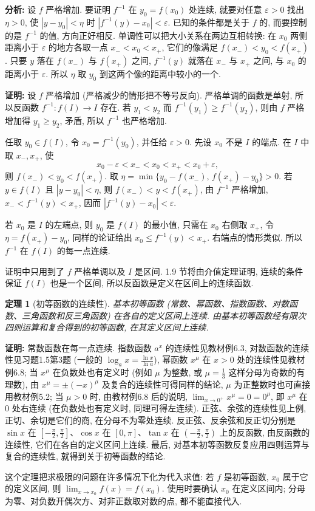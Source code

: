 \documentclass[UTF8,openany]{ctexbook}
\theoremstyle{chinesetextbook}
\newtheorem{theorem}{定理}[section]
\newenvironment{cnproof}{\par\indent\textbf{证明:} \ignorespaces}{\par}
\begin{document}
\par\indent\textbf{分析:} 设 $f$ 严格增加. 要证明 $f^{-1}$ 在 $y_0=f(x_0)$ 处连续, 就要对任意 $\varepsilon>0$ 找出 $\eta>0$, 使 $|y-y_0|<\eta$ 时 $|f^{-1}(y)-x_0|<\varepsilon$. 已知的条件都是关于 $f$ 的, 而要控制的是 $f^{-1}$ 的值, 方向正好相反. 单调性可以把大小关系在两边互相转换: 在 $x_0$ 两侧距离小于 $\varepsilon$ 的地方各取一点 $x_-<x_0<x_+$, 它们的像满足 $f(x_-)<y_0<f(x_+)$. 只要 $y$ 落在 $f(x_-)$ 与 $f(x_+)$ 之间, $f^{-1}(y)$ 就落在 $x_-$ 与 $x_+$ 之间, 与 $x_0$ 的距离小于 $\varepsilon$. 所以 $\eta$ 取 $y_0$ 到这两个像的距离中较小的一个.
\begin{cnproof}
设 $f$ 严格增加 (严格减少的情形把不等号反向). 严格单调的函数是单射, 所以反函数 $f^{-1}:f(I)\to I$ 存在. 若 $y_1<y_2$ 而 $f^{-1}(y_1)\ge f^{-1}(y_2)$, 则由 $f$ 严格增加得 $y_1\ge y_2$, 矛盾, 所以 $f^{-1}$ 也严格增加.

任取 $y_0\in f(I)$, 令 $x_0=f^{-1}(y_0)$, 并任给 $\varepsilon>0$. 先设 $x_0$ 不是 $I$ 的端点. 在 $I$ 中取 $x_-,x_+$, 使
\[
x_0-\varepsilon<x_-<x_0<x_+<x_0+\varepsilon,
\]
则 $f(x_-)<y_0<f(x_+)$. 取 $\eta=\min\{y_0-f(x_-),\,f(x_+)-y_0\}>0$. 若 $y\in f(I)$ 且 $|y-y_0|<\eta$, 则 $f(x_-)<y<f(x_+)$, 由 $f^{-1}$ 严格增加, $x_-<f^{-1}(y)<x_+$, 因而 $|f^{-1}(y)-x_0|<\varepsilon$.

若 $x_0$ 是 $I$ 的左端点, 则 $y_0$ 是 $f(I)$ 的最小值, 只需在 $x_0$ 右侧取 $x_+$, 令 $\eta=f(x_+)-y_0$, 同样的论证给出 $x_0\le f^{-1}(y)<x_+$. 右端点的情形类似. 所以 $f^{-1}$ 在 $f(I)$ 的每一点连续.
\end{cnproof}
证明中只用到了 $f$ 严格单调以及 $I$ 是区间. 1.9 节将由介值定理证明, 连续的条件保证 $f(I)$ 也是一个区间, 所以反函数是定义在区间上的连续函数.
\begin{theorem}[初等函数的连续性]
基本初等函数 (常数、幂函数、指数函数、对数函数、三角函数和反三角函数) 在各自的定义区间上连续. 由基本初等函数经有限次四则运算和复合得到的初等函数, 在其定义区间上连续.
\end{theorem}
\begin{cnproof}
常数函数在每一点连续. 指数函数 $a^x$ 的连续性见教材例6.3, 对数函数的连续性见习题1.5第3题 (一般的 $\displaystyle\log_ax=\frac{\ln x}{\ln a}$), 幂函数 $x^\mu$ 在 $x>0$ 处的连续性见教材例6.8; 当 $x^\mu$ 在负数处也有定义时 (例如 $\mu$ 为整数, 或 $\displaystyle\mu=\frac13$ 这样分母为奇数的有理数), 由 $x^\mu=\pm(-x)^\mu$ 及复合的连续性可得同样的结论, $\mu$ 为正整数时也可直接用教材例5.2; 当 $\mu>0$ 时, 由教材例6.8 后的说明, $\displaystyle\lim_{x\to0^+}x^\mu=0=0^\mu$, 即 $x^\mu$ 在 $0$ 处右连续 (在负数处也有定义时, 同理可得左连续). 正弦、余弦的连续性见上例, 正切、余切是它们的商, 在分母不为零处连续. 反正弦、反余弦和反正切分别是 $\sin x$ 在 $\displaystyle\left[-\frac\pi2,\frac\pi2\right]$、$\cos x$ 在 $[0,\pi]$、$\tan x$ 在 $\displaystyle\left(-\frac\pi2,\frac\pi2\right)$ 上的反函数, 由反函数的连续性, 它们在各自的定义区间上连续. 最后, 对基本初等函数反复应用四则运算与复合的连续性, 就得到关于初等函数的结论.
\end{cnproof}
这个定理把求极限的问题在许多情况下化为代入求值: 若 $f$ 是初等函数, $x_0$ 属于它的定义区间, 则 $\displaystyle\lim_{x\to x_0}f(x)=f(x_0)$. 使用时要确认 $x_0$ 在定义区间内; 分母为零、对负数开偶次方、对非正数取对数的点, 都不能直接代入.
\end{document}

